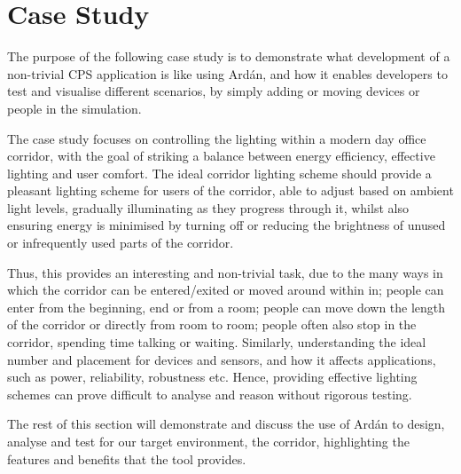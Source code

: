 \section{Case Study}
\label{sec:Case Study: Corridor}

The purpose of the following case study is to demonstrate what development of a non-trivial CPS application is like using Ard\'{a}n, and how it enables developers to test and visualise different scenarios, by simply adding or moving devices or people in the simulation.

The case study focuses on controlling the lighting within a modern day office corridor, with the goal of striking a balance between energy efficiency, effective lighting and user comfort. The ideal corridor lighting scheme should provide a pleasant lighting scheme for users of the corridor, able to adjust based on ambient light levels, gradually illuminating as they progress through it, whilst also ensuring energy is minimised by turning off or reducing the brightness of unused or infrequently used parts of the corridor.

Thus, this provides an interesting and non-trivial task, due to the many ways in which the corridor can be entered/exited or moved around within in; people can enter from the beginning, end or from a room; people can move down the length of the corridor or directly from room to room; people often also stop in the corridor, spending time talking or waiting. Similarly, understanding the ideal number and placement for devices and sensors, and how it affects applications, such as power, reliability, robustness etc. Hence, providing effective lighting schemes can prove difficult to analyse and reason without rigorous testing.

The rest of this section will demonstrate and discuss the use of Ard\'{a}n to design, analyse and test for our target environment, the corridor, highlighting the features and benefits that the tool provides.


